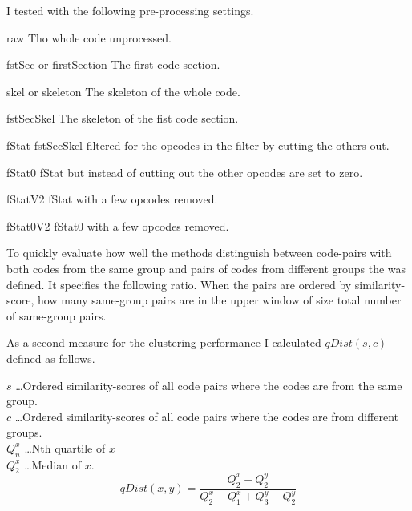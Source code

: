 \documentclass[../main.tex]{subfiles}
\begin{document}
I tested with the following pre-processing settings.

\begin{desc}
  \item[raw] Tho whole code unprocessed.
  \item[fstSec or firstSection] The first code section.
  \item[skel or skeleton] The skeleton of the whole code.
  \item[fstSecSkel] The skeleton of the fist code section.
  \item[fStat] fstSecSkel filtered for the opcodes in the  filter by cutting the others out.
  \item[fStat0] fStat but instead of cutting out the other opcodes are set to zero.
  \item[fStatV2] fStat with a few opcodes removed.
  \item[fStat0V2] fStat0 with a few opcodes removed.
\end{desc}

To quickly evaluate how well the methods distinguish between code-pairs with both codes from the same group and pairs of codes from different groups the  was defined.
It specifies the following ratio.
When the pairs are ordered by similarity-score, how many same-group pairs are in the upper window of size total number of same-group pairs.

As a second measure for the clustering-performance I calculated $qDist(s,c)$ defined as follows.

$s$ \dots Ordered similarity-scores of all code pairs where the codes are from the same group.\\
$c$ \dots Ordered similarity-scores of all code pairs where the codes are from different groups.\\
$Q_n^x$ \dots Nth quartile of $x$\\
$Q_2^x$ \dots Median of $x$.
\begin{equation}
  qDist(x,y) = \dfrac{Q_2^x - Q_2^y}{Q_2^x - Q_1^x + Q_3^y - Q_2^y}
  \label{eq:qDist}
\end{equation}
\end{document}
